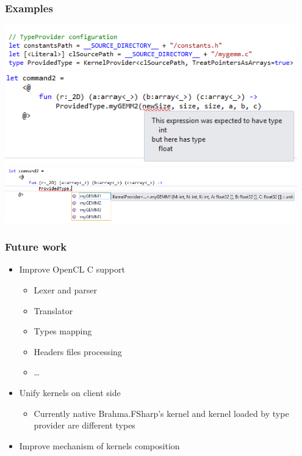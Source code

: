 \documentclass[xcolor=table]{beamer}
\begin{document}
            
\begin{frame}
  \transwipe[direction=90]
  \frametitle{Examples}         
  \includegraphics[width=0.95\textwidth]{pictures/smpl1.png}
  \pause
  \\
  \includegraphics[width=0.95\textwidth]{pictures/smpl3.png}
  \pause
  \\
  \includegraphics[width=0.95\textwidth]{pictures/smpl2.png}

\end{frame}     

\begin{frame}
  \transwipe[direction=90]
  \frametitle{Future work}         
\begin{itemize}
\item Improve OpenCL C support
\begin{itemize}
\item Lexer and parser
\item Translator 
\item Types mapping
\item Headers files processing
\item \dots
\end{itemize}
\item Unify kernels on client side
\begin{itemize}
\item Currently native Brahma.FSharp's kernel and kernel loaded by type provider are different 
types
\end{itemize}
\item Improve mechanism of kernels composition
\end{itemize}
\end{frame}     
            
\end{document}
